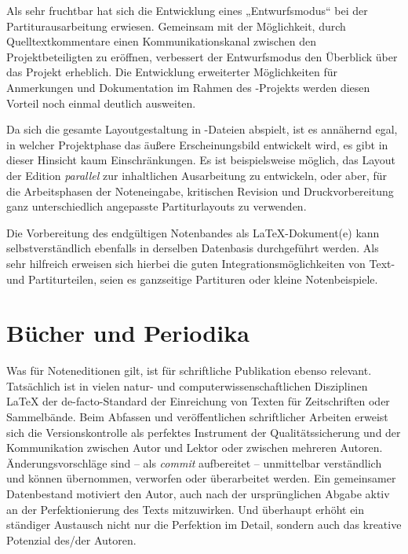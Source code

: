 \documentclass[DIV=12]{scrreprt}
\begin{document}
Als sehr fruchtbar hat sich die Entwicklung eines „Entwurfsmodus“ bei der Partiturausarbeitung erwiesen.
Gemeinsam mit der Möglichkeit, durch Quelltextkommentare einen Kommunikationskanal zwischen den Projektbeteiligten zu eröffnen, verbessert der Entwurfsmodus den Überblick über das Projekt erheblich.
Die Entwicklung erweiterter Möglichkeiten für Anmerkungen und Dokumentation im Rahmen des -Projekts werden diesen Vorteil noch einmal deutlich ausweiten.

Da sich die gesamte Layoutgestaltung in -Dateien abspielt, ist es annähernd egal, in welcher Projektphase das äußere Erscheinungsbild entwickelt wird, es gibt in dieser Hinsicht kaum Einschränkungen.
Es ist beispielsweise möglich, das Layout der Edition \emph{parallel} zur inhaltlichen Ausarbeitung zu entwickeln, oder aber, für die Arbeitsphasen der Noteneingabe, kritischen Revision und Druckvorbereitung ganz unterschiedlich angepasste Partiturlayouts zu verwenden.

Die Vorbereitung des endgültigen Notenbandes als LaTeX-Dokument(e) kann selbstverständlich ebenfalls in derselben Datenbasis durchgeführt werden.
Als sehr hilfreich erweisen sich hierbei die guten Integrationsmöglichkeiten von Text- und Partiturteilen, seien es ganzseitige Partituren oder kleine Notenbeispiele.

\section{Bücher und Periodika}
\label{sec:pt_books-periodicals}
Was für Noteneditionen gilt, ist für schriftliche Publikation ebenso relevant.
Tatsächlich ist in vielen natur- und computerwissenschaftlichen Disziplinen \LaTeX{} der de-facto-Standard der Einreichung von Texten für Zeitschriften oder Sammelbände.
Beim Abfassen und veröffentlichen schriftlicher Arbeiten erweist sich die Versionskontrolle als perfektes Instrument der Qualitätssicherung und der Kommunikation zwischen Autor und Lektor oder zwischen mehreren Autoren.
Änderungsvorschläge sind -- als \emph{commit} aufbereitet -- unmittelbar verständlich und können übernommen, verworfen oder überarbeitet werden.
Ein gemeinsamer Datenbestand motiviert den Autor, auch nach der ursprünglichen Abgabe aktiv an der Perfektionierung des Texts mitzuwirken.
Und überhaupt erhöht ein ständiger Austausch nicht nur die Perfektion im Detail, sondern auch das kreative Potenzial des/der Autoren.
\end{document}
